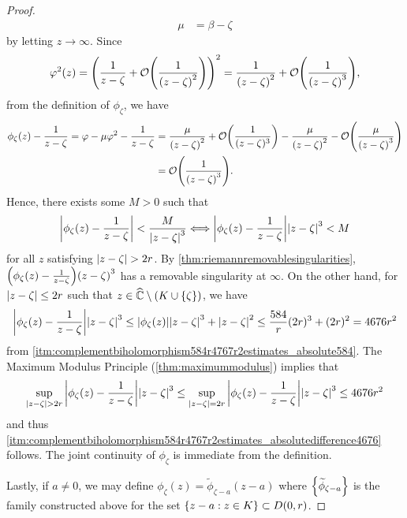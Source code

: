 \begin{proof}
\begin{align*}
        \mu                                       & =\beta-\zeta
    \end{align*} by letting \(z\to\infty\). Since \[\varphi^2(z)=\qty(\frac{1}{z-\zeta}+\order{\frac1{\qty(z-\zeta)^2}})^2=\frac{1}{\qty(z-\zeta)^2}+\order{\frac{1}{\qty(z-\zeta)^3}},\] from the definition of \(\phi_\zeta\), we have
    \begin{align*}
        \phi_\zeta(z)-\frac{1}{z-\zeta}=\varphi-\mu\varphi^2-\frac{1}{z-\zeta} & =\frac{\mu}{\qty(z-\zeta)^2}+\order{\frac1{(z-\zeta)^3}}-\frac{\mu}{\qty(z-\zeta)^2}-\order{\frac{\mu}{\qty(z-\zeta)^3}} \\
        & =\order{\frac1{\qty(z-\zeta)^3}}.
    \end{align*}
    Hence, there exists some \(M>0\) such that \[\abs{\phi_\zeta(z)-\frac{1}{z-\zeta}}<\frac{M}{\abs{z-\zeta}^3}\Longleftrightarrow\abs{\phi_\zeta(z)-\frac{1}{z-\zeta}}\abs{z-\zeta}^3<M\] for all \(z\) satisfying \(\abs{z-\zeta}>2r\). By \cref{thm:riemannremovablesingularities}, \(\qty(\phi_\zeta(z)-\frac{1}{z-\zeta})\qty(z-\zeta)^3\) has a removable singularity at \(\infty\). On the other hand, for \(\abs{z-\zeta}\leq 2r\) such that \(z\in\extcomplex\setminus\qty(K\cup\cbraces{\zeta})\), we have \[\abs{\phi_\zeta(z)-\frac{1}{z-\zeta}}\abs{z-\zeta}^3\leq\abs{\phi_\zeta(z)}\abs{z-\zeta}^3+\abs{z-\zeta}^2\leq\frac{584}{r}(2r)^3+(2r)^2=4676r^2\] from \cref{itm:complementbiholomorphism584r4767r2estimates_absolute584}. The Maximum Modulus Principle (\cref{thm:maximummodulus}) implies that \[\sup_{\abs{z-\zeta}>2r}\abs{\phi_\zeta(z)-\frac{1}{z-\zeta}}\abs{z-\zeta}^3\leq\sup_{\abs{z-\zeta}=2r}\abs{\phi_\zeta(z)-\frac{1}{z-\zeta}}\abs{z-\zeta}^3\leq 4676r^2\] and thus \cref{itm:complementbiholomorphism584r4767r2estimates_absolutedifference4676} follows. The joint continuity of \(\phi_\zeta\) is immediate from the definition.

    Lastly, if \(a\neq 0\), we may define \(\phi_\zeta(z)=\widetilde{\phi}_{\zeta-a}(z-a)\) where \(\cbraces{\widetilde{\phi}_{\zeta-a}}\) is the family constructed above for the set \(\cbraces{z-a}{z\in K}\subset D(0,r)\).
\end{proof}
